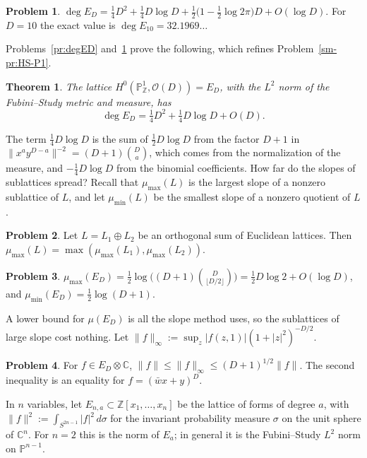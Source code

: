 \documentclass[reqno]{amsart}
\theoremstyle{definition}
\newtheorem{problem}{Problem}[section]
\theoremstyle{plain}
\newtheorem{theorem}{Theorem}[section]
\newcommand{\Z}{\mathbb{Z}}
\newcommand{\C}{\mathbb{C}}
\newcommand{\Pb}{\mathbb{P}}
\newcommand{\Oc}{\mathcal{O}}
\newcommand{\mumax}{\mu_{\max}}
\newcommand{\mumin}{\mu_{\min}}
\begin{document}
\begin{problem}\label{pr:degED-asym}
\(\deg E_D = \tfrac14 D^2 + \tfrac14 D\log D + \tfrac12\bigl(1 - \tfrac12\log 2\pi\bigr) D + O(\log D)\).  For \(D = 10\) the exact value is \(\deg E_{10} = 32.1969\ldots\)
\end{problem}

Problems~\ref{pr:degED} and~\ref{pr:degED-asym} prove the following, which refines Problem~\ref{sm-pr:HS-P1}.

\begin{theorem}\label{thm:P1}
The lattice \(H^0(\Pb^1_\Z, \Oc(D)) = E_D\), with the \(L^2\) norm of the Fubini--Study metric and measure, has
\[
  \deg E_D = \tfrac14 D^2 + \tfrac14 D\log D + O(D) .
\]
\end{theorem}

The term \(\tfrac14 D\log D\) is the sum of \(\tfrac12 D\log D\) from the factor \(D+1\) in \(\lVert x^a y^{D-a} \rVert^{-2} = (D+1)\binom{D}{a}\), which comes from the normalization of the measure, and \(-\tfrac14 D\log D\) from the binomial coefficients.  How far do the slopes of sublattices spread?  Recall that \(\mumax(L)\) is the largest slope of a nonzero sublattice of \(L\), and let \(\mumin(L)\) be the smallest slope of a nonzero quotient of \(L\).

\begin{problem}\label{pr:orth-sum}
Let \(L = L_1 \oplus L_2\) be an orthogonal sum of Euclidean lattices.  Then \(\mumax(L) = \max(\mumax(L_1), \mumax(L_2))\).
\end{problem}

\begin{problem}\label{pr:hn-P1}
\(\mumax(E_D) = \tfrac12 \log\bigl((D+1)\binom{D}{\lfloor D/2 \rfloor}\bigr) = \tfrac12 D\log 2 + O(\log D)\), and \(\mumin(E_D) = \tfrac12\log(D+1)\).
\end{problem}

A lower bound for \(\mu(E_D)\) is all the slope method uses, so the sublattices of large slope cost nothing.  Let \(\lVert f \rVert_\infty := \sup_z \lvert f(z, 1) \rvert (1 + \lvert z \rvert^2)^{-D/2}\).

\begin{problem}\label{pr:bergman}
For \(f \in E_D \otimes \C\), \(\lVert f \rVert \le \lVert f \rVert_\infty \le (D+1)^{1/2} \lVert f \rVert\).  The second inequality is an equality for \(f = (\bar w x + y)^D\).
\end{problem}

In \(n\) variables, let \(E_{n,a} \subset \Z[x_1, \dots, x_n]\) be the lattice of forms of degree \(a\), with \(\lVert f \rVert^2 := \int_{S^{2n-1}} \lvert f \rvert^2 \, d\sigma\) for the invariant probability measure \(\sigma\) on the unit sphere of \(\C^n\).  For \(n = 2\) this is the norm of \(E_a\); in general it is the Fubini--Study \(L^2\) norm on \(\Pb^{n-1}\).
\end{document}
